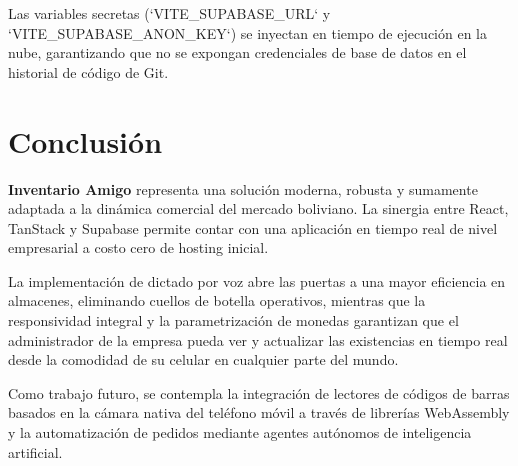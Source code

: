\documentclass[11pt,a4paper]{article}
\begin{document}
Las variables secretas (`VITE_SUPABASE_URL` y `VITE_SUPABASE_ANON_KEY`) se inyectan en tiempo de ejecución en la nube, garantizando que no se expongan credenciales de base de datos en el historial de código de Git.

\section{Conclusión}
\textbf{Inventario Amigo} representa una solución moderna, robusta y sumamente adaptada a la dinámica comercial del mercado boliviano. La sinergia entre React, TanStack y Supabase permite contar con una aplicación en tiempo real de nivel empresarial a costo cero de hosting inicial. 

La implementación de dictado por voz abre las puertas a una mayor eficiencia en almacenes, eliminando cuellos de botella operativos, mientras que la responsividad integral y la parametrización de monedas garantizan que el administrador de la empresa pueda ver y actualizar las existencias en tiempo real desde la comodidad de su celular en cualquier parte del mundo.

Como trabajo futuro, se contempla la integración de lectores de códigos de barras basados en la cámara nativa del teléfono móvil a través de librerías WebAssembly y la automatización de pedidos mediante agentes autónomos de inteligencia artificial.
\end{document}
